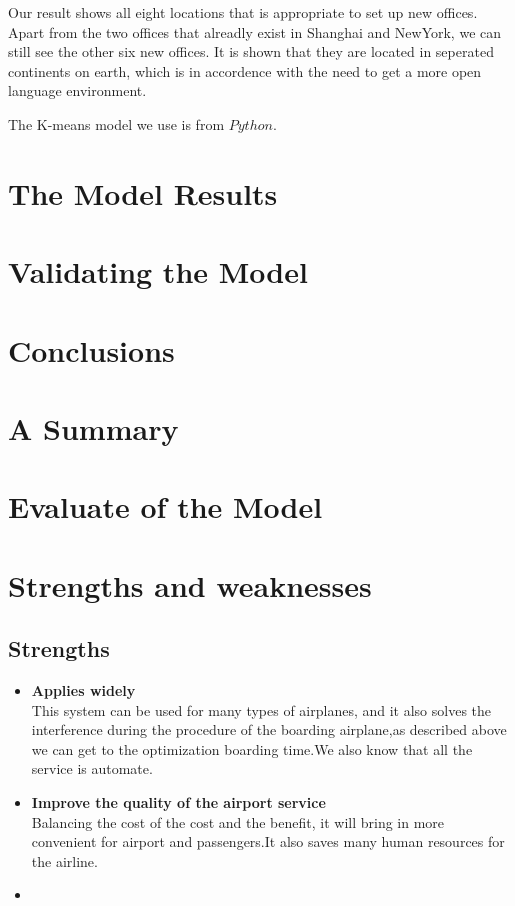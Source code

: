 \documentclass{mcmthesis}
\begin{document}
  \indent Our result shows all eight locations that is appropriate to set up new offices. Apart from the two offices that alreadly exist in Shanghai and NewYork, we can still see the other six new offices. It is shown that they are located in seperated continents on earth, which is in accordence with the need to get a more open language environment.

  \indent The K-means model we use is from $Python$. 

\section{The Model Results}

\section{Validating the Model}

\section{Conclusions}

\section{A Summary}

\section{Evaluate of the Model}

\section{Strengths and weaknesses}

\subsection{Strengths}
\begin{itemize}
\item \textbf{Applies widely}\\
This  system can be used for many types of airplanes, and it also
solves the interference during  the procedure of the boarding
airplane,as described above we can get to the  optimization
boarding time.We also know that all the service is automate.
\item \textbf{Improve the quality of the airport service}\\
Balancing the cost of the cost and the benefit, it will bring in
more convenient  for airport and passengers.It also saves many
human resources for the airline. \item \textbf{}
\end{itemize}
\end{document}
